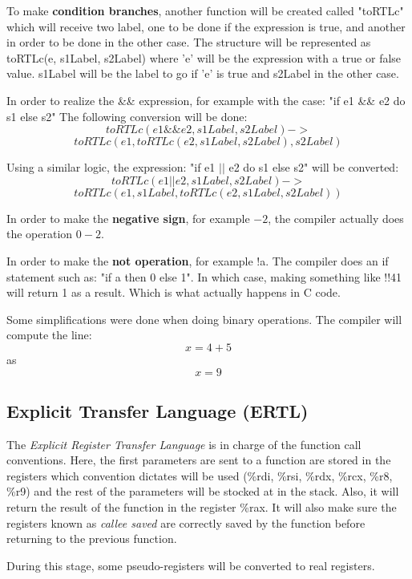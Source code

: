 \documentclass[conference]{IEEEtran}
\begin{document}
To make \textbf{condition branches}, another function will be created called "toRTLc" which will receive two label, one to be done if the expression is true, and another in order to be done in the other case. The structure will be represented as toRTLc(e, s1Label, s2Label) where 'e' will be the expression with a true or false value. s1Label will be the label to go if 'e' is true and s2Label in the other case.

In order to realize the \&\& expression, for example with the case:
"if e1 \&\& e2 do s1 else s2"
The following conversion will be done:
\[toRTLc(e1 \&\& e2, s1Label, s2Label) -> \]
\[toRTLc(e1, toRTLc(e2, s1Label, s2Label), s2Label)\]

Using a similar logic, the expression:
"if e1 $|$$|$ e2 do s1 else s2"
will be converted:
\[toRTLc(e1 || e2, s1Label, s2Label) -> \]
\[toRTLc(e1, s1Label, toRTLc(e2, s1Label, s2Label))\]

In order to make the \textbf{negative sign}, for example \(-2\), the compiler actually does the operation \(0 - 2\).

In order to make the \textbf{not operation}, for example !a. The compiler does an if statement such as:
"if a then 0 else 1".
In which case, making something like !!41 will return 1 as a result. Which is what actually happens in C code.

Some simplifications were done when doing binary operations. The compiler will compute the line:
\[ x = 4 + 5\]
as
\[x = 9\]


\subsection{Explicit Transfer Language (ERTL)}

The \textit{Explicit Register Transfer Language} is in charge of the function call conventions. Here, the first parameters are sent to a function are stored in the registers which convention dictates will be used (\%rdi, \%rsi, \%rdx, \%rcx, \%r8, \%r9) and the rest of the parameters will be stocked at in the stack. Also, it will return the result of the function in the register \%rax. It will also make sure the registers known as \textit{callee saved} are correctly saved by the function before returning to the previous function.

During this stage, some pseudo-registers will be converted to real registers.  
\end{document}
